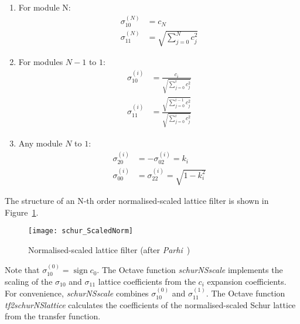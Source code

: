 \documentclass[a4paper,twoside,10pt,english]{report}
\begin{document}
\begin{enumerate}
\item For module N:
\begin{align}
\sigma_{10}^{(N)} & = c_{N}\label{eq:ScaleNormS10}\\
\sigma_{11}^{(N)} & = \sqrt{\sum_{j=0}^{N}c_{j}^{2}}\label{eq:ScaleNormS11}
\end{align}

\item For modules $N-1$ to $1$:
\begin{align}
\sigma_{10}^{(i)} & = \frac{c_{i}}{\sqrt{\sum_{j=0}^{i}c_{j}^{2}}}\label{eq:ScaleNormS10other}\\
\sigma_{11}^{(i)} & = \frac{\sqrt{\sum_{j=0}^{i-1}c_{j}^{2}}}{\sqrt{\sum_{j=0}^{i}c_{j}^{2}}}\label{eq:ScaleNormS11other}
\end{align}

\item Any module $N$ to $1$:
\begin{align}
\sigma_{20}^{(i)} & = -\sigma_{02}^{(i)}=k_{i}\label{eq:ScaleNormS20}\\
\sigma_{00}^{(i)} & = \sigma_{22}^{(i)}=\sqrt{1-k_{i}^{2}}\label{eq:ScaleNormS00}
\end{align}
\end{enumerate}
The structure of an N-th order normalised-scaled lattice filter is shown in 
Figure~\ref{fig:Normalised-scaled-lattice}. 
\begin{figure}[!htbp]
\begin{center}
\texttt{[image: schur\_ScaledNorm]}
\caption{Normalised-scaled lattice filter (after 
\emph{Parhi}~\cite[Fig. 12.19]{Parhi_VLSIDigitalSignalProcessingSystems})}
\label{fig:Normalised-scaled-lattice}
\end{center}
\end{figure}
Note that $\sigma_{10}^{(0)}=\operatorname{sign} c_{0}$. The Octave function 
\emph{schurNSscale} implements the scaling of the $\sigma_{10}$ and $\sigma_{11}$
lattice coefficients from the $c_{i}$ expansion coefficients. For convenience,
\emph{schurNSscale} combines $\sigma_{10}^{(0)}$ and $\sigma_{11}^{(1)}$. The Octave
function \emph{tf2schurNSlattice} calculates the coefficients of the 
normalised-scaled Schur lattice from the transfer function.
\end{document}
